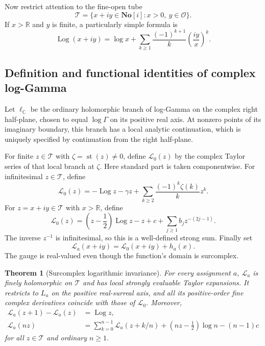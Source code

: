 \documentclass[11pt,letterpaper]{article}
\numberwithin{equation}{section}
\newtheorem{theorem}{Theorem}[section]
\theoremstyle{plain}
\theoremstyle{definition}
\theoremstyle{remark}
\newcommand{\SC}{\mathbf{No}[i]}
\newcommand{\R}{\mathbb R}
\newcommand{\C}{\mathbb C}
\newcommand{\Ocal}{\mathcal O}
\newcommand{\st}{\operatorname{st}}
\newcommand{\Log}{\operatorname{Log}}
\newcommand{\tube}{\mathcal T}
\newcommand{\Lt}{\mathcal L}
\begin{document}
Now restrict attention to the fine-open tube
\[
 \tube=\{x+iy\in\SC:x>0,\ y\in\Ocal\}.
\]
If $x>\R$ and $y$ is finite, a particularly simple formula is
\begin{equation}\label{eq:log-infinite-complex}
 \Log(x+iy)=\log x+\sum_{k\ge1}
 \frac{(-1)^{k+1}}k\left(\frac{iy}{x}\right)^k.
\end{equation}

\subsection{Definition and functional identities of complex log-Gamma}
Let $\ell_{\C}$ be the ordinary holomorphic branch of log-Gamma on the
complex right half-plane, chosen to equal $\log\Gamma$ on its positive
real axis. At nonzero points of its imaginary boundary, this branch has a
local analytic continuation, which is uniquely specified by continuation
from the right half-plane.

For finite $z\in\tube$ with $\zeta=\st(z)\ne0$, define
$\Lt_0(z)$ by the complex Taylor series of that local branch at $\zeta$.
Here standard part is taken componentwise. For infinitesimal $z\in\tube$,
define
\begin{equation}\label{eq:complex-small}
 \Lt_0(z)=-\Log z-\gamma z+
 \sum_{k\ge2}\frac{(-1)^k\zeta(k)}k z^k.
\end{equation}
For $z=x+iy\in\tube$ with $x>\R$, define
\begin{equation}\label{eq:complex-infinite}
 \Lt_0(z)=\left(z-\frac12\right)\Log z-z+c+
 \sum_{j\ge1}b_jz^{-(2j-1)}.
\end{equation}
The inverse $z^{-1}$ is infinitesimal, so this is a well-defined strong sum.
Finally set
\begin{equation}\label{eq:complex-gauge}
 \Lt_a(x+iy)=\Lt_0(x+iy)+h_a(x).
\end{equation}
The gauge is real-valued even though the function's domain is surcomplex.

\begin{theorem}[Surcomplex logarithmic invariance]\label{thm:complex-log}
For every assignment $a$, $\Lt_a$ is finely holomorphic on $\tube$ and
has local strongly evaluable Taylor expansions. It restricts to $L_a$ on
the positive real-surreal axis, and all its positive-order fine complex
derivatives coincide with those of $\Lt_0$. Moreover,
\begin{align}
 \Lt_a(z+1)-\Lt_a(z)&=\Log z,\label{eq:complex-recurrence}\\
 \Lt_a(nz)&=\sum_{k=0}^{n-1}\Lt_a(z+k/n)
 +(nz-\tfrac12)\log n-(n-1)c\label{eq:complex-gauss}
\end{align}
for all $z\in\tube$ and ordinary $n\ge1$.
\end{theorem}
\end{document}

